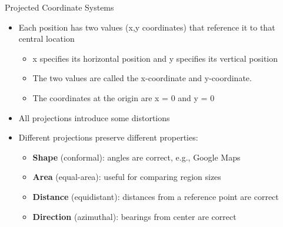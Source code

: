 \documentclass[dvipsnames,hyperref={pdfpagelabels=false}]{beamer}
\begin{document}
 
\begin{frame}{Projected Coordinate Systems}
\begin{itemize}
	
	\item Each position has two values (x,y coordinates) that reference it to that central location
	\vspace{0.2cm}
	\begin{itemize}
		\item x specifies its horizontal position and y specifies its vertical position
		\vspace{0.2cm}
		\item The two values are called the x-coordinate and y-coordinate. 
		\vspace{0.2cm}
		\item The coordinates at the origin are x = 0 and y = 0
	\end{itemize}
	\vspace{0.2cm}
	\item All projections introduce some distortions 
	\vspace{0.2cm}
	\item Different projections preserve different properties:
	\vspace{0.2cm}
	\begin{itemize}
		\item \textbf{Shape} (conformal): angles are correct, e.g., Google Maps
		\vspace{0.1cm}
		\item \textbf{Area} (equal-area): useful for comparing region sizes
		\vspace{0.1cm}
		\item \textbf{Distance} (equidistant): distances from a reference point are correct
		\vspace{0.1cm}
		\item \textbf{Direction} (azimuthal): bearings from center are correct
	\end{itemize}
	
\end{itemize}
\end{frame}
 
\end{document}
